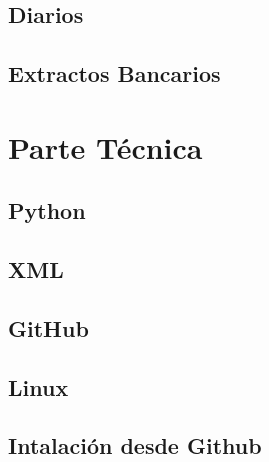 \documentclass[letterpaper,10pt,spanish]{sphinxmanual}
\begin{document}
\section{Diarios}
\label{\detokenize{funcional/contabilidad/diarios:diarios}}\label{\detokenize{funcional/contabilidad/diarios:id1}}\label{\detokenize{funcional/contabilidad/diarios::doc}}

\section{Extractos Bancarios}
\label{\detokenize{funcional/contabilidad/extractos-bancarios:extractos-bancarios}}\label{\detokenize{funcional/contabilidad/extractos-bancarios:id1}}\label{\detokenize{funcional/contabilidad/extractos-bancarios::doc}}

\chapter{Parte Técnica}
\label{\detokenize{index:parte-tecnica}}


\section{Python}
\label{\detokenize{tecnico/previo/python:python}}\label{\detokenize{tecnico/previo/python:id1}}\label{\detokenize{tecnico/previo/python::doc}}

\section{XML}
\label{\detokenize{tecnico/previo/xml:xml}}\label{\detokenize{tecnico/previo/xml:id1}}\label{\detokenize{tecnico/previo/xml::doc}}

\section{GitHub}
\label{\detokenize{tecnico/previo/github:github}}\label{\detokenize{tecnico/previo/github:id1}}\label{\detokenize{tecnico/previo/github::doc}}

\section{Linux}
\label{\detokenize{tecnico/previo/linux:linux}}\label{\detokenize{tecnico/previo/linux:id1}}\label{\detokenize{tecnico/previo/linux::doc}}


\section{Intalación desde Github}
\label{\detokenize{tecnico/entorno/odoo-server:intalacion-desde-github}}\label{\detokenize{tecnico/entorno/odoo-server:odoo-server}}\label{\detokenize{tecnico/entorno/odoo-server::doc}}
\end{document}
